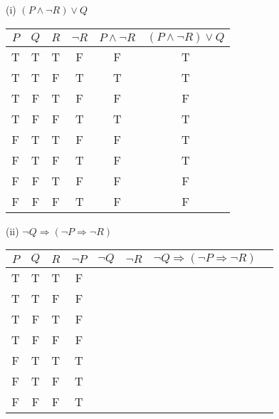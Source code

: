 \documentclass{article}
\begin{document}
(i) $(P \land \neg R) \lor Q$\\
\begin{tabular}{|c|c|c|c|c|c|}
    \hline
    $P$ & $Q$ & $R$ & $\neg R$ & $ P \land \neg R$ & $(P \land \neg R) \lor Q$ \\
    \hline
    T   & T   & T   & F        & F                 & T                         \\
    T   & T   & F   & T        & T                 & T                         \\
    T   & F   & T   & F        & F                 & F                         \\
    T   & F   & F   & T        & T                 & T                         \\
    F   & T   & T   & F        & F                 & T                         \\
    F   & T   & F   & T        & F                 & T                         \\
    F   & F   & T   & F        & F                 & F                         \\
    F   & F   & F   & T        & F                 & F                         \\
    \hline
\end{tabular}

(ii) $\neg Q \Rightarrow (\neg P \Rightarrow \neg R)$\\
\begin{tabular}{|c|c|c|c|c|c|c|c|}
    \hline
    $P$ & $Q$ & $R$ & $\neg P $ & $\neg Q$ & $\neg R$ & $\neg Q \Rightarrow (\neg P \Rightarrow \neg R)$ \\
    \hline
    T   & T   & T   &  F   &                                                                               \\
    T   & T   & F   &  F    &                                                                              \\
    T   & F   & T   &  F     &                                                                             \\
    T   & F   & F   &   F     &                                                                            \\
    F   & T   & T   &    T     &                                                                           \\
    F   & T   & F   &     T     &                                                                         \\
    F   & F   & F   &       T    &                                                                         \\
    \hline
\end{tabular}
\end{document}
